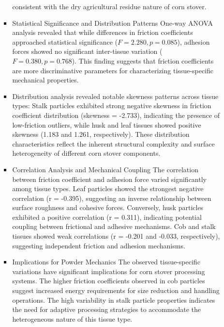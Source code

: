 \documentclass[xcolor=dvipsnames,10pt,hidelinks]{article}
\begin{document}
\begin{itemize}
\begin{itemize}
\begin{itemize}
consistent with the dry agricultural residue nature of corn stover.
\item Statistical Significance and Distribution Patterns \newline
\label{sec:org7cd9cca}
One-way ANOVA analysis revealed that while differences in friction coefficients approached statistical significance (\(F = 2.280, p = 0.085\)),
adhesion forces showed no significant inter-tissue variation (\(F = 0.380, p = 0.768\)).
This finding suggests that friction coefficients are more discriminative parameters for characterizing tissue-specific mechanical properties.
\item Distribution analysis revealed notable skewness patterns across tissue types: \newline
\label{sec:orgeef3fdb}
Stalk particles exhibited strong negative skewness in friction coefficient distribution (skewness = -2.733), indicating the presence of low-friction outliers, while husk and leaf tissues showed positive skewness (1.183 and 1.261, respectively). These distribution characteristics reflect the inherent structural complexity and surface heterogeneity of different corn stover components.
\item Correlation Analysis and Mechanical Coupling \newline
\label{sec:org9573ea2}
The correlation between friction coefficient and adhesion force varied significantly among tissue types. Leaf particles showed the strongest negative correlation (r = -0.395), suggesting an inverse relationship between surface roughness and cohesive forces. Conversely, husk particles exhibited a positive correlation (r = 0.311), indicating potential coupling between frictional and adhesive mechanisms. Cob and stalk tissues showed weak correlations (r = -0.201 and -0.033, respectively), suggesting independent friction and adhesion mechanisms.
\item Implications for Powder Mechanics \newline
\label{sec:org7d78d31}
The observed tissue-specific variations have significant implications for corn stover processing systems. The higher friction coefficients observed in cob particles suggest increased energy requirements for size reduction and handling operations. The high variability in stalk particle properties indicates the need for adaptive processing strategies to accommodate the heterogeneous nature of this tissue type.


\end{itemize}
\end{itemize}
\end{itemize}
\end{document}

